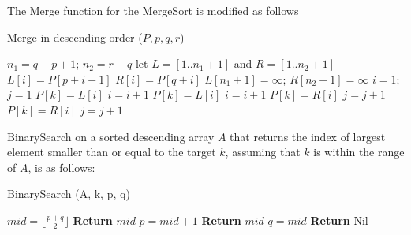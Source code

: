 \documentclass[12pt]{article}
\begin{document}
\noindent The Merge function for the MergeSort is modified as follows
\begin{algorithm}[H]
     \caption{Merge in descending order (\(P, p, q, r\))}
     \begin{algorithmic}[1]
          \State \(n_1 = q-p+1\); \(n_2 = r-q\)
          \State let \(L=[1 .. n_1 + 1]\) and \(R=[1.. n_2 +1]\)
               \State \(L[i] = P[p+i-1]\) 
          \EndFor
               \State \(R[i] = P[q+i]\) 
          \EndFor
          \State \(L[n_1+1] = \infty\); \(R[n_2+1] = \infty\)
          \State \(i = 1\); \(j = 1\)
                 
                    \State \(P[k] = L[i]\)
                    \State \(i = i + 1\)
                     
                         \State \(P[k] = L[i]\)
                         \State \(i = i + 1\)
                    \Else 
                         \State \(P[k] = R[i]\)
                         \State \(j = j + 1\)
                    \EndIf
               \Else
                    \State \(P[k] = R[i]\)
                    \State \(j = j + 1\)
               \EndIf
          \EndFor
     \end{algorithmic}
\end{algorithm}
\noindent BinarySearch on a sorted descending array \(A\) that returns the index of largest element smaller than or equal to the target \(k\), assuming that \(k\) is within the range of \(A\), is as follows:
\begin{algorithm}[H]
     \caption{BinarySearch (A, k, p, q)}
     \begin{algorithmic}[1]
               \State \(mid = \lfloor\frac{p+q}{2}\rfloor\)
                
                    \State \textbf{Return} \(mid\)
                    \State \(p = mid+1\)
               \Else 
                         \State \textbf{Return} \(mid\)
                    \EndIf
                    \State \(q = mid\)
               \EndIf
          \EndWhile
          \State \textbf{Return} Nil
     \end{algorithmic}
\end{algorithm}
\end{document}
